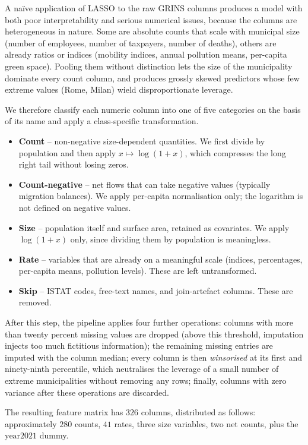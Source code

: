 \documentclass[11pt,a4paper]{article}
\begin{document}
A naïve application of LASSO to the raw GRINS columns produces a model
with both poor interpretability and serious numerical issues, because
the columns are heterogeneous in nature. Some are absolute counts that
scale with municipal size (number of employees, number of taxpayers,
number of deaths), others are already ratios or indices (mobility
indices, annual pollution means, per-capita green space). Pooling them
without distinction lets the size of the municipality dominate every
count column, and produces grossly skewed predictors whose few
extreme values (Rome, Milan) wield disproportionate leverage.

We therefore classify each numeric column into one of five categories
on the basis of its name and apply a class-specific transformation.
\begin{itemize}[leftmargin=2em]
  \item \textbf{Count} -- non-negative size-dependent quantities. We
    first divide by population and then apply \(x\mapsto\log(1+x)\),
    which compresses the long right tail without losing zeros.
  \item \textbf{Count-negative} -- net flows that can take negative
    values (typically migration balances). We apply per-capita
    normalisation only; the logarithm is not defined on negative values.
  \item \textbf{Size} -- population itself and surface area, retained
    as covariates. We apply \(\log(1+x)\) only, since dividing them by
    population is meaningless.
  \item \textbf{Rate} -- variables that are already on a meaningful
    scale (indices, percentages, per-capita means, pollution levels).
    These are left untransformed.
  \item \textbf{Skip} -- ISTAT codes, free-text names, and
    join-artefact columns. These are removed.
\end{itemize}

After this step, the pipeline applies four further operations:
columns with more than twenty percent missing values are dropped (above
this threshold, imputation injects too much fictitious information);
the remaining missing entries are imputed with the column median;
every column is then \emph{winsorised} at its first and ninety-ninth
percentile, which neutralises the leverage of a small number of
extreme municipalities without removing any rows; finally, columns with
zero variance after these operations are discarded.

The resulting feature matrix has \(326\) columns, distributed as
follows: approximately \(280\) counts, \(41\) rates, three size
variables, two net counts, plus the \(\text{year2021}\) dummy.
\end{document}

